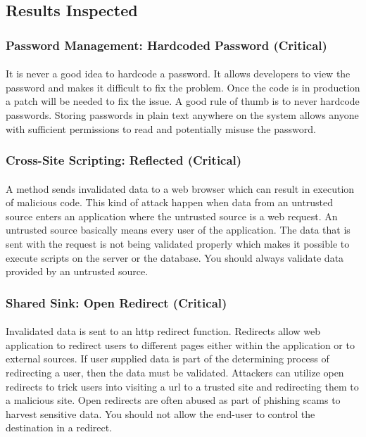 \documentclass[11pt,english,a4paper]{report}
\begin{document}
\subsection{Results Inspected}
\subsubsection{Password Management: Hardcoded Password (Critical)}
\paragraph{}
It is never a good idea to hardcode a password.
It allows developers to view the password and makes it difficult to fix the problem. 
Once the code is in production a patch will be needed to fix the issue.
A good rule of thumb is to never hardcode passwords.
Storing passwords in plain text anywhere on the system allows anyone with sufficient permissions to read and potentially misuse the password.


\subsubsection{Cross-Site Scripting: Reflected (Critical)}
\paragraph{}
A method sends invalidated data to a web browser which can result in execution of malicious code.
This kind of attack happen when data from an untrusted source enters an application where the untrusted source is a web request.
An untrusted source basically means every user of the application.
The data that is sent with the request is not being validated properly which makes it possible to execute scripts on the server or the database.
You should always validate data provided by an untrusted source.


\subsubsection{Shared Sink: Open Redirect (Critical)}
\paragraph{}
Invalidated data is sent to an \gls{http} redirect function. 
Redirects allow web application to redirect users to different pages either within the application or to external sources.
If user supplied data is part of the determining process of redirecting a user, then the data must be validated.
Attackers can utilize open redirects to trick users into visiting a \gls{url} to a trusted site and redirecting them to a malicious site.
Open redirects are often abused as part of phishing scams to harvest sensitive data.
You should not allow the end-user to control the destination in a redirect.
\end{document}
